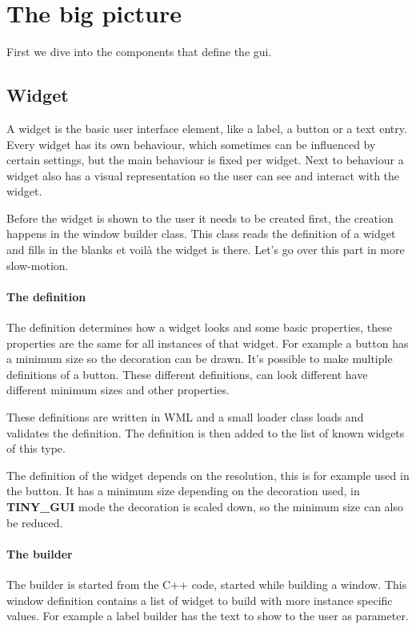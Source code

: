 \documentclass[a4paper,notitlepage,twocolumn,draft]{report}
\begin{document}
\section{The big picture}

First we dive into the components that define the gui.

\subsection{Widget}

A widget is the basic user interface element, like a label, a button or a text
entry. Every widget has its own behaviour, which sometimes can be influenced by
certain settings, but the main behaviour is fixed per widget. Next to behaviour
a widget also has a visual representation so the user can see and interact with
the widget.

Before the widget is shown to the user it needs to be created first, the
creation happens in the window builder class. This class reads the definition of
a widget and fills in the blanks et voil\`a the widget is there. Let's go over
this part in more slow-motion.

\paragraph{The definition}
The definition determines how a widget looks and some basic properties, these
properties are the same for all instances of that widget. For example a button
has a minimum size so the decoration can be drawn. It's possible to make
multiple definitions of a button. These different definitions, can look
different have different minimum sizes and other properties.

These definitions are written in WML and a small loader class loads and
validates the definition. The definition is then added to the list of known
widgets of this type.

The definition of the widget depends on the resolution, this is for example used
in the button. It has a minimum size depending on the decoration used, in
\textbf{TINY\_GUI} mode the decoration is scaled down, so the minimum size can
also be reduced.

\paragraph{The builder}
The builder is started from the C++ code, started while building a window. This
window definition contains a list of widget to build with more instance specific
values. For example a label builder has the text to show to the user as
parameter.
\end{document}

